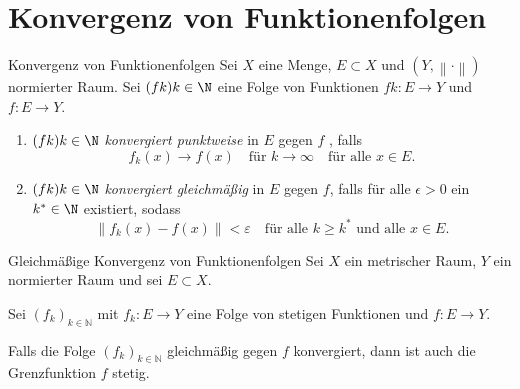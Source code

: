 \newpage
\section{Konvergenz von Funktionenfolgen}
\label{3.4}

\begin{definition}{Konvergenz von Funktionenfolgen}
    Sei $X$ eine Menge, $E \subset X$ und $(Y, \left\|\cdot\right\|)$ normierter Raum. Sei $(fk){k\in\N}$ eine Folge von Funktionen $fk : E \to Y$ und $f : E \to Y$.
    \begin{enumerate}
        \item $(fk){k\in\N}$ \emph{konvergiert punktweise} in $E$ gegen $f$ , falls
        $$
            f_k(x) \rightarrow f(x) \quad \text{für } k \rightarrow \infty\quad \text{für alle } x \in E.
        $$
        \item $(fk){k\in\N}$ \emph{konvergiert gleichmäßig} in $E$ gegen $f$, falls für alle $\epsilon > 0$ ein $k^* \in  \N$ existiert, sodass
        $$
            \|f_k(x) - f(x)\| < \varepsilon \quad \text{für alle } k \ge k^* \text{ und alle } x \in E.
        $$
    \end{enumerate}
\end{definition}

\begin{satz}{Gleichmäßige Konvergenz von Funktionenfolgen}
    Sei $X$ ein metrischer Raum, $Y$ ein normierter Raum und sei $E\subset X$.
    \vspace{1em}

    Sei $(f_k)_{k\in\mathbb{N}}$ mit $f_k\colon E\to Y$ eine Folge von stetigen Funktionen und $f\colon E\to Y$.
    \vspace{1em}

    Falls die Folge $(f_k)_{k\in\mathbb{N}}$ gleichmäßig gegen $f$ konvergiert, dann ist auch die Grenzfunktion $f$ stetig.
\end{satz}

